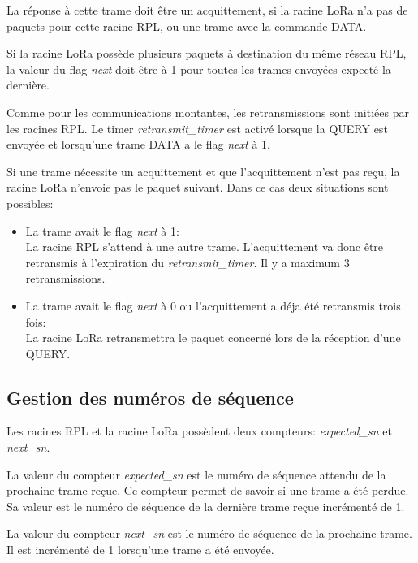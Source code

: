     La réponse à cette trame doit être un acquittement, si la racine LoRa n'a pas de paquets pour cette racine RPL, ou une trame avec la commande DATA.

    Si la racine LoRa possède plusieurs paquets à destination du même réseau RPL, la valeur du flag \textit{next} doit être à 1 pour toutes les trames envoyées expecté la dernière.

    Comme pour les communications montantes, les retransmissions sont initiées par les racines RPL.
    Le timer \textit{retransmit\_timer} est activé lorsque la QUERY est envoyée et lorsqu'une trame DATA a le flag \textit{next} à 1.

    Si une trame nécessite un acquittement et que l'acquittement n'est pas reçu, la racine LoRa n'envoie pas le paquet suivant. Dans ce cas deux situations sont possibles:
    \begin{itemize}
        \item La trame avait le flag \textit{next} à 1:\\
            La racine RPL s'attend à une autre trame. L'acquittement va donc être retransmis à l'expiration du \textit{retransmit\_timer}. Il y a maximum 3 retransmissions.
        \item La trame avait le flag \textit{next} à 0 ou l'acquittement a déja été retransmis trois fois:\\
            La racine LoRa retransmettra le paquet concerné lors de la réception d'une QUERY.
    \end{itemize}

\subsection*{Gestion des numéros de séquence}
    Les racines RPL et la racine LoRa possèdent deux compteurs: \textit{expected\_sn} et \textit{next\_sn}.

    La valeur du compteur \textit{expected\_sn} est le numéro de séquence attendu de la prochaine trame reçue. Ce compteur permet de savoir si une trame a été perdue. Sa valeur est le numéro de séquence de la dernière trame reçue incrémenté de 1.

    La valeur du compteur \textit{next\_sn} est le numéro de séquence de la prochaine trame. Il est incrémenté de 1 lorsqu'une trame a été envoyée.

